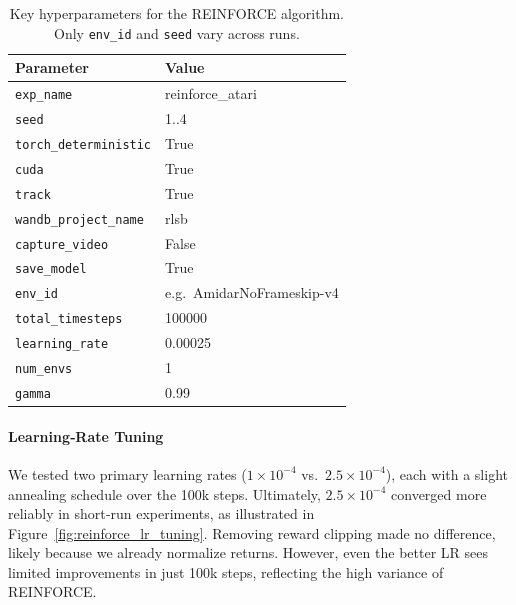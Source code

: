\begin{table}[htbp]
	\caption{Key hyperparameters for the REINFORCE algorithm. Only \texttt{env\_id} and \texttt{seed} vary across runs.}
	\label{tab:reinforce_hyperparams}
	\centering
	\begin{tabular}{ll}
		\toprule
		\textbf{Parameter} & \textbf{Value} \\
		\midrule
		\texttt{exp\_name}            & reinforce\_atari \\
		\texttt{seed}                 & 1..4 \\
		\texttt{torch\_deterministic} & True \\
		\texttt{cuda}                 & True \\
		\texttt{track}                & True \\
		\texttt{wandb\_project\_name} & rlsb \\
		\texttt{capture\_video}       & False \\
		\texttt{save\_model}          & True \\
		\texttt{env\_id}              & e.g.\ AmidarNoFrameskip-v4 \\
		\texttt{total\_timesteps}     & 100000 \\
		\texttt{learning\_rate}       & 0.00025 \\
		\texttt{num\_envs}            & 1 \\
		\texttt{gamma}                & 0.99 \\
		\bottomrule
	\end{tabular}
\end{table}

\paragraph{Learning‐Rate Tuning}
We tested two primary learning rates ($1\times10^{-4}$ vs.\ $2.5\times10^{-4}$), each with a slight annealing schedule over the 100k steps. 
Ultimately, $2.5\times10^{-4}$ converged more reliably in short‐run experiments, as illustrated in Figure~\ref{fig:reinforce_lr_tuning}. 
Removing reward clipping made no difference, likely because we already normalize returns. 
However, even the better LR sees limited improvements in just 100k steps, reflecting the high variance of REINFORCE.

